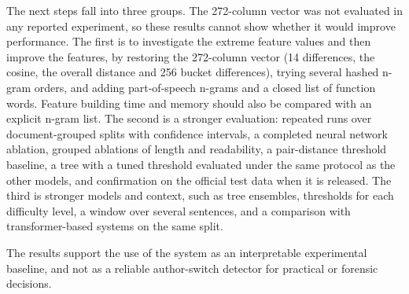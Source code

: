 \documentclass[runningheads]{llncs}
\begin{document}
The next steps fall into three groups. The 272-column vector was not evaluated in any reported experiment, so these results cannot show whether it would improve performance. The first is to investigate the extreme feature values and then improve the features, by restoring the 272-column vector (14 differences, the cosine, the overall distance and 256 bucket differences), trying several hashed n-gram orders, and adding part-of-speech n-grams and a closed list of function words. Feature building time and memory should also be compared with an explicit n-gram list. The second is a stronger evaluation: repeated runs over document-grouped splits with confidence intervals, a completed neural network ablation, grouped ablations of length and readability, a pair-distance threshold baseline, a tree with a tuned threshold evaluated under the same protocol as the other models, and confirmation on the official test data when it is released. The third is stronger models and context, such as tree ensembles, thresholds for each difficulty level, a window over several sentences, and a comparison with transformer-based systems on the same split.

The results support the use of the system as an interpretable experimental baseline, and not as a reliable author-switch detector for practical or forensic decisions.



\end{document}
